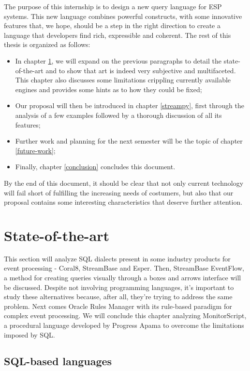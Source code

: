 \documentclass{report}
\begin{document}
The purpose of this internship is to design a new query language for
ESP systems. This new language combines powerful constructs, with some
innovative features that, we hope, should be a step in the right
direction to create a language that developers find rich, expressible
and coherent. The rest of this thesis is organized as follows:

\begin{itemize}
\item In chapter \ref{state-of-the-art}, we will expand on the
  previous paragraphs to detail the state-of-the-art and to show that
  art is indeed very subjective and multifaceted. This chapter also
  discusses some limitations crippling currently available engines and
  provides some hints as to how they could be fixed;
\item Our proposal will then be introduced in chapter \ref{streampy},
  first through the analysis of a few examples followed by a thorough
  discussion of all its features;
\item Further work and planning for the next semester will be the
  topic of chapter \ref{future-work};
\item Finally, chapter \ref{conclusion} concludes this document.
\end{itemize}

By the end of this document, it should be clear that not only current
technology will fail short of fulfilling the increasing needs of
costumers, but also that our proposal contains some interesting
characteristics that deserve further attention.

\chapter{State-of-the-art}
\label{state-of-the-art}

This section will analyze SQL dialects present in some industry
products for event processing - Coral8, StreamBase and Esper. Then,
StreamBase EventFlow, a method for creating queries visually through a
boxes and arrows interface will be discussed. Despite not involving
programming languages, it's important to study these alternatives
because, after all, they're trying to address the same problem. Next
comes Oracle Rules Manager with its rule-based paradigm for complex
event processing. We will conclude this chapter analyzing
MonitorScript, a procedural language developed by Progress Apama to
overcome the limitations imposed by SQL.

\section{SQL-based languages}
\end{document}
